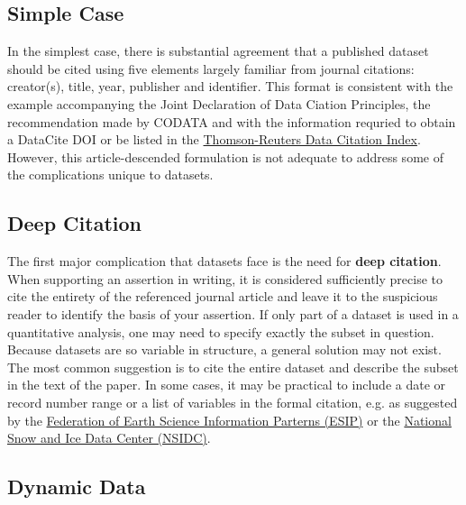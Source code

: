 \documentclass[10pt,twocolumn]{article}
\begin{document}
\subsection*{Simple Case}\label{simple-case}

In the simplest case, there is substantial agreement that a published dataset should be cited using five elements largely familiar from journal citations: creator(s), title, year, publisher and identifier. 
This format is consistent with the example accompanying the Joint Declaration of Data Ciation Principles, the recommendation made by CODATA\cite{codata-icsti_task_group_on_data_citation_standards_and_practices_out_2013} and with the information requried to obtain a DataCite DOI\cite{datacite_datacite_2013} or be listed in the \href{http://thomsonreuters.com/data-citation-index/}{Thomson-Reuters Data Citation Index}.
However, this article-descended formulation is not adequate to address some of the complications unique to datasets.

\subsection*{Deep Citation}\label{deep-citation}

The first major complication that datasets face is the need for \textbf{deep citation}. 
When supporting an assertion in writing, it is considered sufficiently precise to cite the entirety of the referenced journal article and leave it to the suspicious reader to identify the basis of your assertion. 
If only part of a dataset is used in a quantitative analysis, one may need to specify exactly the subset in question. 
Because datasets are so variable in structure, a general solution may not exist. 
The most common suggestion is to cite the entire dataset and describe the subset in the text of the paper.\cite{altman_a_2007,}
In some cases, it may be practical to include a date or record number range or a list of variables in the formal citation, e.g. as suggested by the  \href{http://wiki.esipfed.org/index.php/Interagency_Data_Stewardship/Citations/provider_guidelines#Subset_Used}{Federation of Earth Science Information Parterns (ESIP)} or the \href{http://nsidc.org/about/use_copyright.html}{National Snow and Ice Data Center (NSIDC)}. 

\subsection*{Dynamic Data}\label{dynamic-data}
\end{document}
